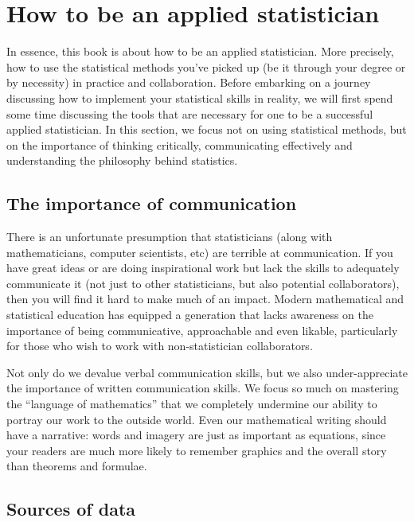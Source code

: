 

\chapter{How to be an applied statistician}
\label{ch:how}


In essence, this book is about how to be an applied statistician. More precisely, how to use the statistical methods you've picked up (be it through your degree or by necessity) in practice and collaboration. Before embarking on a journey discussing how to implement your statistical skills in reality, we will first spend some time discussing the tools that are necessary for one to be a successful applied statistician. In this section, we focus not on using statistical methods, but on the importance of thinking critically, communicating effectively and understanding the philosophy behind statistics.


\section{The importance of communication}

There is an unfortunate presumption that statisticians (along with mathematicians, computer scientists, etc) are terrible at communication. If you have great ideas or are doing inspirational work but lack the skills to adequately communicate it (not just to other statisticians, but also potential collaborators), then you will find it hard to make much of an impact. Modern mathematical and statistical education has equipped a generation that lacks awareness on the importance of being communicative, approachable and even likable, particularly for those who wish to work with non-statistician collaborators. 


Not only do we devalue verbal communication skills, but we also under-appreciate the importance of written communication skills. We focus so much on mastering the ``language of mathematics'' that we completely undermine our ability to portray our work to the outside world. Even our mathematical writing should have a narrative: words and imagery are just as important as equations, since your readers are much more likely to remember graphics and the overall story than theorems and formulae.


\section{Sources of data}

